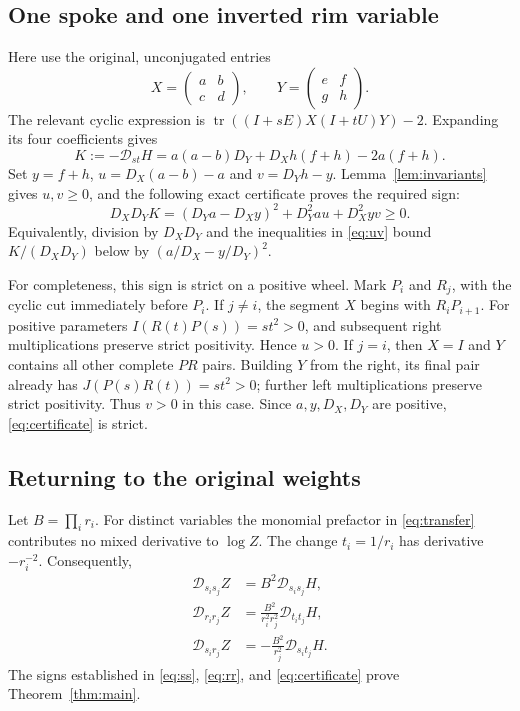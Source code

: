 \documentclass[11pt]{article}
\newcommand{\tr}{\operatorname{tr}}
\newcommand{\Del}{\mathcal D}
\begin{document}
\subsection{One spoke and one inverted rim variable}
Here use the original, unconjugated entries
\[
 X=\begin{pmatrix}a&b\\c&d\end{pmatrix},\qquad
 Y=\begin{pmatrix}e&f\\g&h\end{pmatrix}.
\]
The relevant cyclic expression is $\tr((I+sE)X(I+tU)Y)-2$. Expanding its four coefficients gives
\begin{equation}\label{eq:mixed}
 K:=-\Del_{st}H=a(a-b)D_Y+D_Xh(f+h)-2a(f+h).
\end{equation}
Set $y=f+h$, $u=D_X(a-b)-a$ and $v=D_Yh-y$. Lemma~\ref{lem:invariants} gives $u,v\ge0$, and the following exact certificate proves the required sign:
\begin{equation}\label{eq:certificate}
 \boxed{D_XD_YK=(D_Ya-D_Xy)^2+D_Y^2a u+D_X^2y v\ge0.}
\end{equation}
Equivalently, division by $D_XD_Y$ and the inequalities in \eqref{eq:uv} bound $K/(D_XD_Y)$ below by $(a/D_X-y/D_Y)^2$.

For completeness, this sign is strict on a positive wheel. Mark $P_i$ and $R_j$, with the cyclic cut immediately before $P_i$. If $j\ne i$, the segment $X$ begins with $R_iP_{i+1}$. For positive parameters $I(R(t)P(s))=st^2>0$, and subsequent right multiplications preserve strict positivity. Hence $u>0$. If $j=i$, then $X=I$ and $Y$ contains all other complete $PR$ pairs. Building $Y$ from the right, its final pair already has $J(P(s)R(t))=st^2>0$; further left multiplications preserve strict positivity. Thus $v>0$ in this case. Since $a,y,D_X,D_Y$ are positive, \eqref{eq:certificate} is strict.

\subsection{Returning to the original weights}
Let $B=\prod_i r_i$. For distinct variables the monomial prefactor in \eqref{eq:transfer} contributes no mixed derivative to $\log Z$. The change $t_i=1/r_i$ has derivative $-r_i^{-2}$. Consequently,
\begin{align*}
 \Del_{s_i s_j}Z&=B^2\Del_{s_i s_j}H,\\
 \Del_{r_i r_j}Z&=\frac{B^2}{r_i^2r_j^2}\Del_{t_i t_j}H,\\
 \Del_{s_i r_j}Z&=-\frac{B^2}{r_j^2}\Del_{s_i t_j}H.
\end{align*}
The signs established in \eqref{eq:ss}, \eqref{eq:rr}, and \eqref{eq:certificate} prove Theorem~\ref{thm:main}.
\end{document}
